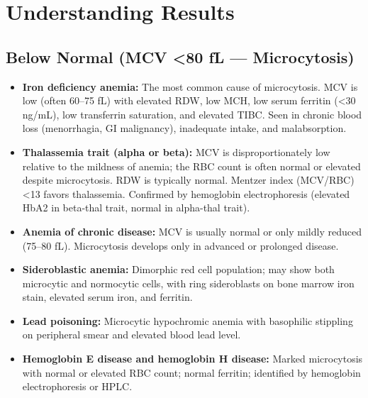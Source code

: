 \section*{Understanding Results}

\subsection*{Below Normal (MCV <80 fL --- Microcytosis)}
\begin{itemize}
  \item \textbf{Iron deficiency anemia:} The most common cause of microcytosis. MCV is low (often 60--75 fL) with elevated RDW, low MCH, low serum ferritin (<30 ng/mL), low transferrin saturation, and elevated TIBC. Seen in chronic blood loss (menorrhagia, GI malignancy), inadequate intake, and malabsorption.
  \item \textbf{Thalassemia trait (alpha or beta):} MCV is disproportionately low relative to the mildness of anemia; the RBC count is often normal or elevated despite microcytosis. RDW is typically normal. Mentzer index (MCV/RBC) <13 favors thalassemia. Confirmed by hemoglobin electrophoresis (elevated HbA2 in beta-thal trait, normal in alpha-thal trait).
  \item \textbf{Anemia of chronic disease:} MCV is usually normal or only mildly reduced (75--80 fL). Microcytosis develops only in advanced or prolonged disease.
  \item \textbf{Sideroblastic anemia:} Dimorphic red cell population; may show both microcytic and normocytic cells, with ring sideroblasts on bone marrow iron stain, elevated serum iron, and ferritin.
  \item \textbf{Lead poisoning:} Microcytic hypochromic anemia with basophilic stippling on peripheral smear and elevated blood lead level.
  \item \textbf{Hemoglobin E disease and hemoglobin H disease:} Marked microcytosis with normal or elevated RBC count; normal ferritin; identified by hemoglobin electrophoresis or HPLC.
\end{itemize}

